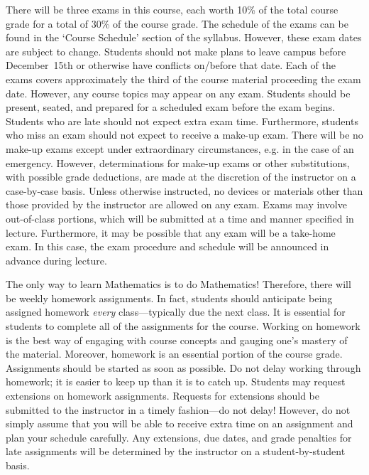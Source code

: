 \documentclass[11pt,letterpaper]{article}
\begin{document}
There will be three exams in this course, each worth 10\% of the total course grade for a total of 30\% of the course grade. The schedule of the exams can be found in the `Course Schedule' section of the syllabus. However, these exam dates are subject to change. Students should not make plans to leave campus before December~15th or otherwise have conflicts on/before that date. Each of the exams covers approximately the third of the course material proceeding the exam date. However, any course topics may appear on any exam. Students should be present, seated, and prepared for a scheduled exam before the exam begins. Students who are late should not expect extra exam time. Furthermore, students who miss an exam should not expect to receive a make-up exam. There will be no make-up exams except under extraordinary circumstances, e.g. in the case of an emergency. However, determinations for make-up exams or other substitutions, with possible grade deductions, are made at the discretion of the instructor on a case-by-case basis. Unless otherwise instructed, no devices or materials other than those provided by the instructor are allowed on any exam. Exams may involve out-of-class portions, which will be submitted at a time and manner specified in lecture. Furthermore, it may be possible that any exam will be a take-home exam. In this case, the exam procedure and schedule will be announced in advance during lecture. 
\pspace



The only way to learn Mathematics is to do Mathematics! Therefore, there will be weekly homework assignments. In fact, students should anticipate being assigned homework {\itshape every} class---typically due the next class. It is essential for students to complete all of the assignments for the course. Working on homework is the best way of engaging with course concepts and gauging one's mastery of the material. Moreover, homework is an essential portion of the course grade. Assignments should be started as soon as possible. Do not delay working through homework; it is easier to keep up than it is to catch up. Students may request extensions on homework assignments. Requests for extensions should be submitted to the instructor in a timely fashion---do not delay! However, do not simply assume that you will be able to receive extra time on an assignment and plan your schedule carefully. Any extensions, due dates, and grade penalties for late assignments will be determined by the instructor on a student-by-student basis. \pspace
\end{document}
